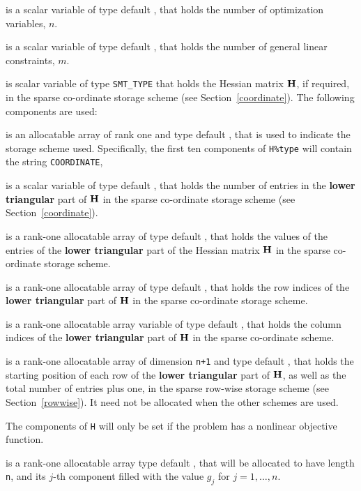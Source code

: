 \documentclass{galahad}
\begin{document}
\begin{description}

 is a scalar variable of type default \integer,
 that holds the number of optimization variables, $n$.

 is a scalar variable of type default \integer,
 that holds the number of general linear constraints, $m$.

 is scalar variable of type {\tt SMT\_TYPE}
that holds the Hessian matrix ${\mathbf{H}}$, if required,
in the sparse co-ordinate storage scheme (see Section~\ref{coordinate}).
The following components are used:

\begin{description}

 is an allocatable array of rank one and type default \character,
that is used to indicate the storage scheme used. Specifically,
the first ten components of {\tt H\%type} will contain the
string {\tt COORDINATE},

 is a scalar variable of type default \integer, that
holds the number of entries in the {\bf lower triangular} part of ${\mathbf{H}}$
in the sparse co-ordinate storage scheme (see Section~\ref{coordinate}).

 is a rank-one allocatable array of type default \realdp, that
holds the values of the entries of the {\bf lower triangular} part
of the Hessian matrix ${\mathbf{H}}$ in the sparse co-ordinate storage scheme.

 is a rank-one allocatable array of type default \integer,
that holds the row indices of the {\bf lower triangular} part of ${\mathbf{H}}$
in the sparse co-ordinate storage scheme.

 is a rank-one allocatable array variable of type default \integer,
that holds the column indices of the {\bf lower triangular} part of
${\mathbf{H}}$ in the sparse co-ordinate scheme.

 is a rank-one allocatable array of dimension {\tt n+1} and type
default \integer, that holds the starting position of
each row of the {\bf lower triangular} part of ${\mathbf{H}}$, as well
as the total number of entries plus one, in the sparse row-wise storage
scheme (see Section~\ref{rowwise}). It need not be allocated when the
other schemes are used.
\end{description}

The components of {\tt H} will only be set if the problem has a
nonlinear objective function.

 is a rank-one allocatable array type default \realdp, that
will be allocated to have length {\tt n}, and its $j$-th component
filled with the value $g_{j}$ for $j = 1, \ldots , n$.


\end{description}
\end{document}
